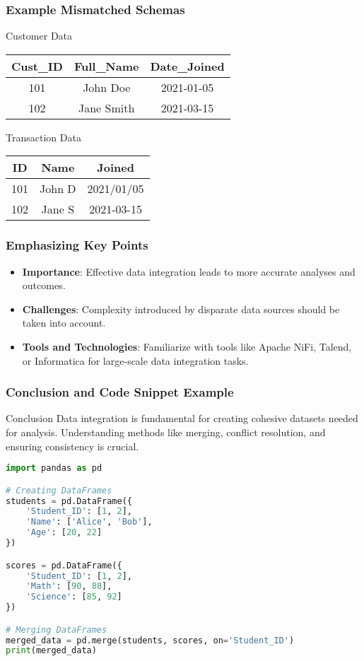 \documentclass[aspectratio=169]{beamer}
\begin{document}
\begin{frame}[fragile]
    \frametitle{Example Mismatched Schemas}
    \begin{block}{Customer Data}
    \begin{tabular}{|c|c|c|}
        \hline
        Cust\_ID & Full\_Name      & Date\_Joined \\
        \hline
        101     & John Doe      & 2021-01-05   \\
        102     & Jane Smith    & 2021-03-15   \\
        \hline
    \end{tabular}
    \end{block}
    \begin{block}{Transaction Data}
    \begin{tabular}{|c|c|c|}
        \hline
        ID      & Name        & Joined        \\
        \hline
        101     & John D     & 2021/01/05    \\
        102     & Jane S     & 2021-03-15    \\
        \hline
    \end{tabular}
    \end{block}
\end{frame}

\begin{frame}
    \frametitle{Emphasizing Key Points}
    \begin{itemize}
        \item \textbf{Importance}:
        Effective data integration leads to more accurate analyses and outcomes.
        \item \textbf{Challenges}:
        Complexity introduced by disparate data sources should be taken into account.
        \item \textbf{Tools and Technologies}:
        Familiarize with tools like Apache NiFi, Talend, or Informatica for large-scale data integration tasks.
    \end{itemize}
\end{frame}

\begin{frame}[fragile]
    \frametitle{Conclusion and Code Snippet Example}
    \begin{block}{Conclusion}
        Data integration is fundamental for creating cohesive datasets needed for analysis. Understanding methods like merging, conflict resolution, and ensuring consistency is crucial.
    \end{block}
    
    \begin{lstlisting}[language=Python]
import pandas as pd

# Creating DataFrames
students = pd.DataFrame({
    'Student_ID': [1, 2],
    'Name': ['Alice', 'Bob'],
    'Age': [20, 22]
})

scores = pd.DataFrame({
    'Student_ID': [1, 2],
    'Math': [90, 88],
    'Science': [85, 92]
})

# Merging DataFrames
merged_data = pd.merge(students, scores, on='Student_ID')
print(merged_data)
    \end{lstlisting}
\end{frame}
\end{document}
